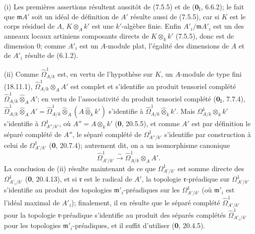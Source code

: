 
(i) Les premières assertions résultent aussitôt de (7.5.5) et de ($\mathbf{0}_{\mathrm I}$, 6.6.2); le fait que $\mathfrak mA'$ soit un idéal de définition de $A'$ résulte aussi de (7.5.5), car si $K$ est le corps résiduel de $A$, $K\otimes_A k'$ est une $k'$-algèbre finie. Enfin $A'_i/\mathfrak mA'_i$ est un des anneaux locaux artiniens composants directs de $K\otimes_k k'$ (7.5.5), donc est de dimension 0; comme $A'_i$ est un $A$-module plat, l'égalité des dimensions de $A$ et de $A'_i$ résulte de (6.1.2).

(ii) Comme $\hat{\Omega}^1_{A/k}$ est, en vertu de l'hypothèse sur $K$, un $A$-module de type fini (18.11.1), $\hat{\Omega}^1_{A/k}\otimes_A A'$ est complet et s'identifie au produit tensoriel complété $\hat{\Omega}^1_{A/k}\widehat{\otimes}_A A'$; en vertu de l'associativité du produit tensoriel complété ($\mathbf{0}_{\mathrm I}$, 7.7.4), $\hat{\Omega}^1_{A/k}\widehat{\otimes}_A A'=\hat{\Omega}^1_{A/k}\widehat{\otimes}_A(A\widehat{\otimes}_k k')$ s'identifie à $\hat{\Omega}^1_{A/k}\widehat{\otimes}_k k'$. Mais $\Omega^1_{A/k}\otimes_k k'$ s'identifie à $\Omega^1_{A''/k'}$, où $A''=A\otimes_k k'$ (\textbf{0}, 20.5.5), et comme $A'$ est par définition le séparé complété de $A''$, le séparé complété de $\Omega^1_{A''/k'}$ s'identifie par construction à celui de $\Omega^1_{A'/k'}$ (\textbf{0}, 20.7.4); autrement dit, on a un isomorphisme canonique
\[
  \hat{\Omega}^1_{A'/k'}\xrightarrow{\sim}\hat{\Omega}^1_{A/k}\otimes_A A'.
\]
La conclusion de (ii) résulte maintenant de ce que $\Omega^1_{A'/k'}$ est somme directe des $\Omega^1_{A'_i/k'}$ (\textbf{0}, 20.4.13), et si $\mathfrak r$ est le radical de $A'$, la topologie $\mathfrak r$-préadique sur $\Omega^1_{A'/k'}$ s'identifie au produit des topologies $\mathfrak m'_i$-préadiques sur les $\Omega^1_{A'/k'}$ (où $\mathfrak m'_i$ est l'idéal maximal de $A'_i$); finalement, il en résulte que le séparé complété $\hat{\Omega}^1_{A'/k'}$ pour la topologie $\mathfrak r$-préadique s'identifie au produit des séparés complétés $\hat{\Omega}^1_{A'_i/k'}$ pour les topologies $\mathfrak m'_i$-préadiques, et il suffit d'utiliser (\textbf{0}, 20.4.5).

